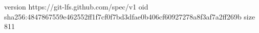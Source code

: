 version https://git-lfs.github.com/spec/v1
oid sha256:4847867559e462552ff1f7cf0f7bd3dfae0b406cf60927278a8f3af7a2ff269b
size 811
